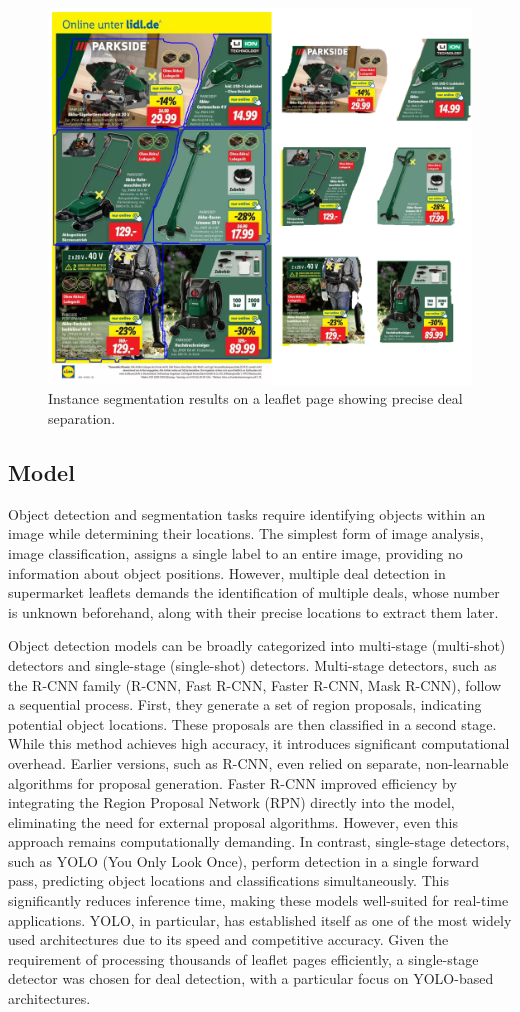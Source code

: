 \documentclass[11pt]{article}
\begin{document}
\begin{figure}[h!]
    \centering
    \includegraphics[width=0.6\linewidth]{figures/deal_detection/mask_page.png}
    \caption{Instance segmentation results on a leaflet page showing precise deal separation.}
    \label{fig:ddetect_mask_page}
\end{figure}

\subsection{Model}
Object detection and segmentation tasks require identifying objects within an image while determining their locations. The simplest form of image analysis, image classification, assigns a single label to an entire image, providing no information about object positions. However, multiple deal detection in supermarket leaflets demands the identification of multiple deals, whose number is unknown beforehand, along with their precise locations to extract them later.

Object detection models can be broadly categorized into multi-stage (multi-shot) detectors and single-stage (single-shot) detectors. Multi-stage detectors, such as the R-CNN family (R-CNN, Fast R-CNN, Faster R-CNN, Mask R-CNN), follow a sequential process. First, they generate a set of region proposals, indicating potential object locations. These proposals are then classified in a second stage. While this method achieves high accuracy, it introduces significant computational overhead. Earlier versions, such as R-CNN, even relied on separate, non-learnable algorithms for proposal generation. Faster R-CNN improved efficiency by integrating the Region Proposal Network (RPN) directly into the model, eliminating the need for external proposal algorithms. However, even this approach remains computationally demanding. In contrast, single-stage detectors, such as YOLO (You Only Look Once), perform detection in a single forward pass, predicting object locations and classifications simultaneously. This significantly reduces inference time, making these models well-suited for real-time applications. YOLO, in particular, has established itself as one of the most widely used architectures due to its speed and competitive accuracy. Given the requirement of processing thousands of leaflet pages efficiently, a single-stage detector was chosen for deal detection, with a particular focus on YOLO-based architectures.
\end{document}
